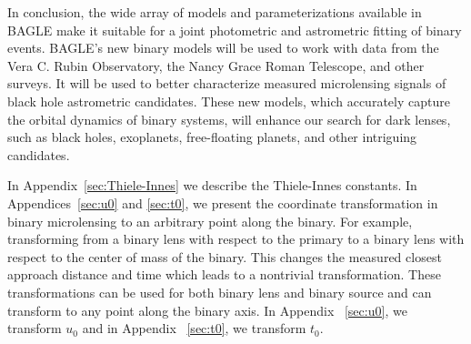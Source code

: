 \documentclass[twocolumn]{aastex701}
\begin{document}





In conclusion, the wide array of models and parameterizations available in BAGLE make it suitable for a joint photometric and astrometric fitting of binary events. BAGLE's new binary models will be used to work with data from the Vera C. Rubin Observatory, the Nancy Grace Roman Telescope, and other surveys. It will be used to better characterize measured microlensing signals of black hole astrometric candidates. These new models, which accurately capture the orbital dynamics of binary systems, will enhance our search for dark lenses, such as black holes, exoplanets, free-floating planets, and other intriguing candidates. 


\vspace{5mm}  



\pagebreak 

\appendix
In Appendix~\ref{sec:Thiele-Innes} we describe the Thiele-Innes constants. In Appendices~\ref{sec:u0} and \ref{sec:t0}, we present the coordinate transformation in binary microlensing to an arbitrary point along the binary. For example, transforming from a binary lens with respect to the primary to a binary lens with respect to the center of mass of the binary. This changes the measured closest approach distance and time which leads to a nontrivial transformation. These transformations can be used for both binary lens and binary source and can transform to any point along the binary axis. In Appendix ~\ref{sec:u0}, we transform $u_0$ and in Appendix ~\ref{sec:t0}, we transform $t_0$.
\end{document}
